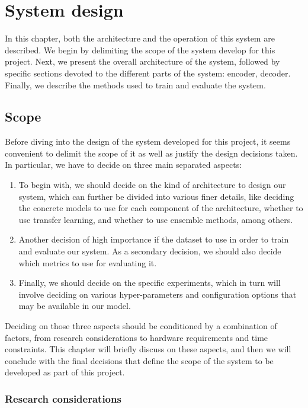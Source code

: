 \chapter{System design}
\label{ch:design}

In this chapter, both the architecture and the operation of this system are described. We begin by delimiting the scope of the system develop for this project. Next, we present the overall architecture of the system, followed by specific sections devoted to the different parts of the system: encoder, decoder. Finally, we describe the methods used to train and evaluate the system.

\section{Scope}\label{sec:scope}

Before diving into the design of the system developed for this project, it seems convenient to delimit the scope of it as well as justify the design decisions taken. In particular, we have to decide on three main separated aspects:

\begin{enumerate}
\item To begin with, we should decide on the kind of architecture to design our system, which can further be divided into various finer details, like deciding the concrete models to use for each component of the architecture, whether to use transfer learning, and whether to use ensemble methods, among others.
\item Another decision of high importance if the dataset to use in order to train and evaluate our system. As a secondary decision, we should also decide which metrics to use for evaluating it.
\item Finally, we should decide on the specific experiments, which in turn will involve deciding on various hyper-parameters and configuration options that may be available in our model.
\end{enumerate}

Deciding on those three aspects should be conditioned by a combination of factors, from research considerations to hardware requirements and time constraints. This chapter will briefly discuss on these aspects, and then we will conclude with the final decisions that define the scope of the system to be developed as part of this project.

\subsection{Research considerations}

